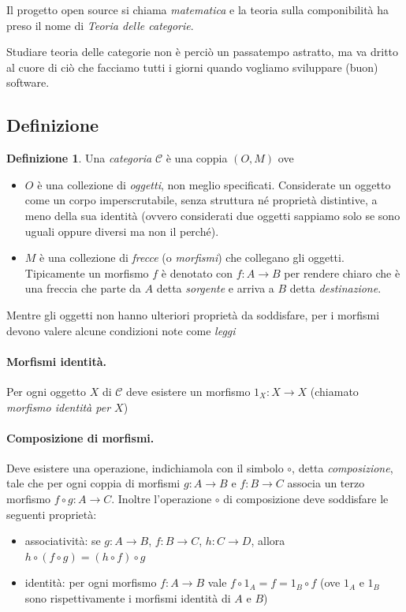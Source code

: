\documentclass[12pt]{article}
\theoremstyle{definition}
\newtheorem{definition}{Definizione}[section]
\begin{document}
Il progetto open source si chiama \emph{matematica} e la teoria sulla componibilità ha preso il nome di \emph{Teoria delle categorie}.

Studiare teoria delle categorie non è perciò un passatempo astratto, ma va dritto al cuore di ciò che facciamo tutti i giorni quando vogliamo
sviluppare (buon) software.

\subsection{Definizione}

\begin{definition}
Una \emph{categoria} $\mathcal{C}$ è una coppia $(O, M)$ ove

\begin{itemize}
  \item $O$ è una collezione di \emph{oggetti}, non meglio specificati. Considerate un oggetto come un corpo imperscrutabile,
  senza struttura né proprietà distintive, a meno della sua identità (ovvero considerati due oggetti sappiamo solo se sono uguali oppure diversi
  ma non il perché).
  \item $M$ è una collezione di \emph{frecce} (o \emph{morfismi}) che collegano gli oggetti. Tipicamente un morfismo $f$ è denotato con $f: A \rightarrow B$
  per rendere chiaro che è una freccia che parte da $A$ detta \emph{sorgente} e arriva a $B$ detta \emph{destinazione}.
\end{itemize}

Mentre gli oggetti non hanno ulteriori proprietà da soddisfare, per i morfismi devono valere alcune condizioni note come \emph{leggi}\\

\paragraph{Morfismi identità.} Per ogni oggetto $X$ di $\mathcal{C}$ deve esistere un morfismo $1_X: X \rightarrow X$ (chiamato \emph{morfismo identità per $X$})\\

\paragraph{Composizione di morfismi.} Deve esistere una operazione, indichiamola con il simbolo $\circ$, detta \emph{composizione}, tale che per ogni coppia di morfismi $g: A \rightarrow B$
e $f: B \rightarrow C$ associa un terzo morfismo $f \circ g: A \rightarrow C$. Inoltre l'operazione $\circ$ di composizione deve soddisfare le seguenti proprietà:

\begin{itemize}
  \item associatività: se $g: A \rightarrow B$, $f: B \rightarrow C$, $h: C \rightarrow D$, allora $h \circ (f \circ g) = (h \circ f) \circ g$
  \item identità: per ogni morfismo $f: A \rightarrow B$ vale $f \circ 1_A = f = 1_B \circ f$ (ove $1_A$ e $1_B$ sono rispettivamente i morfismi identità di $A$ e $B$)
\end{itemize}

\end{definition}
\end{document}
